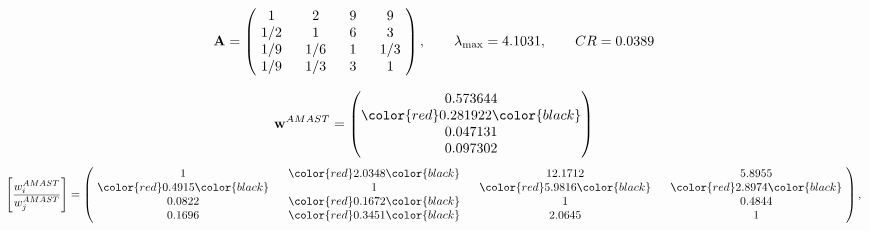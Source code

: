 \begin{example}
\begin{equation*}
\mathbf{A} =
\begin{pmatrix}
$\,\,$ 1 $\,\,$ & $\,\,$2$\,\,$ & $\,\,$9$\,\,$ & $\,\,$9 $\,\,$ \\
$\,\,$ 1/2$\,\,$ & $\,\,$ 1 $\,\,$ & $\,\,$6$\,\,$ & $\,\,$3 $\,\,$ \\
$\,\,$ 1/9$\,\,$ & $\,\,$ 1/6$\,\,$ & $\,\,$ 1 $\,\,$ & $\,\,$ 1/3 $\,\,$ \\
$\,\,$ 1/9$\,\,$ & $\,\,$ 1/3$\,\,$ & $\,\,$3$\,\,$ & $\,\,$ 1  $\,\,$ \\
\end{pmatrix},
\qquad
\lambda_{\max} =
4.1031,
\qquad
CR = 0.0389
\end{equation*}

\begin{equation*}
\mathbf{w}^{AMAST} =
\begin{pmatrix}
0.573644\\
\color{red} 0.281922\color{black} \\
0.047131\\
0.097302
\end{pmatrix}\end{equation*}
\begin{equation*}
\left[ \frac{{w}^{AMAST}_i}{{w}^{AMAST}_j} \right] =
\begin{pmatrix}
$\,\,$ 1 $\,\,$ & $\,\,$\color{red} 2.0348\color{black} $\,\,$ & $\,\,$12.1712$\,\,$ & $\,\,$5.8955$\,\,$ \\
$\,\,$\color{red} 0.4915\color{black} $\,\,$ & $\,\,$ 1 $\,\,$ & $\,\,$\color{red} 5.9816\color{black} $\,\,$ & $\,\,$\color{red} 2.8974\color{black}   $\,\,$ \\
$\,\,$0.0822$\,\,$ & $\,\,$\color{red} 0.1672\color{black} $\,\,$ & $\,\,$ 1 $\,\,$ & $\,\,$0.4844 $\,\,$ \\
$\,\,$0.1696$\,\,$ & $\,\,$\color{red} 0.3451\color{black} $\,\,$ & $\,\,$2.0645$\,\,$ & $\,\,$ 1  $\,\,$ \\
\end{pmatrix},
\end{equation*}


\end{example}
